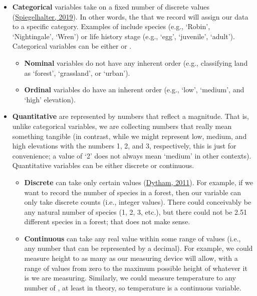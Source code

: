 \documentclass[
  openany]{krantz}
\providecommand{\tightlist}{%
  \setlength{\itemsep}{0pt}\setlength{\parskip}{0pt}}
\begin{document}
\begin{itemize}
\item
  \textbf{Categorical} variables take on a fixed number of discrete values (\protect\hyperlink{ref-Spiegelhalter2019}{Spiegelhalter, 2019}).
  In other words, the  that we record will assign our data to a specific category.
  Examples of  include species (e.g., `Robin', `Nightingale', `Wren') or life history stage (e.g., `egg', `juvenile', `adult').
  Categorical variables can be either  or .

  \begin{itemize}
  \tightlist
  \item
    \textbf{Nominal} variables do not have any inherent order (e.g., classifying land as `forest', `grassland', or `urban').
  \item
    \textbf{Ordinal} variables do have an inherent order (e.g., `low', `medium', and `high' elevation).
  \end{itemize}
\item
  \textbf{Quantitative}  are represented by numbers that reflect a magnitude.
  That is, unlike categorical variables, we are collecting numbers that really mean something tangible (in contrast, while we might represent low, medium, and high elevations with the numbers 1, 2, and 3, respectively, this is just for convenience; a value of `2' does not always mean `medium' in other contexts).
  Quantitative variables can be either discrete or continuous.

  \begin{itemize}
  \item
    \textbf{Discrete}  can take only certain values (\protect\hyperlink{ref-Dytham2011}{Dytham, 2011}).
    For example, if we want to record the number of species in a forest, then our variable can only take discrete counts (i.e., integer values).
    There could conceivably be any natural number of species (1, 2, 3, etc.), but there could not be 2.51 different species in a forest; that does not make sense.
  \item
    \textbf{Continuous}  can take any real value within some range of values (i.e., any number that can be represented by a decimal).
    For example, we could measure height to as many  as our measuring device will allow, with a range of values from zero to the maximum possible height of whatever it is we are measuring.
    Similarly, we could measure temperature to any number of , at least in theory, so temperature is a continuous variable.
  \end{itemize}
\end{itemize}
\end{document}
